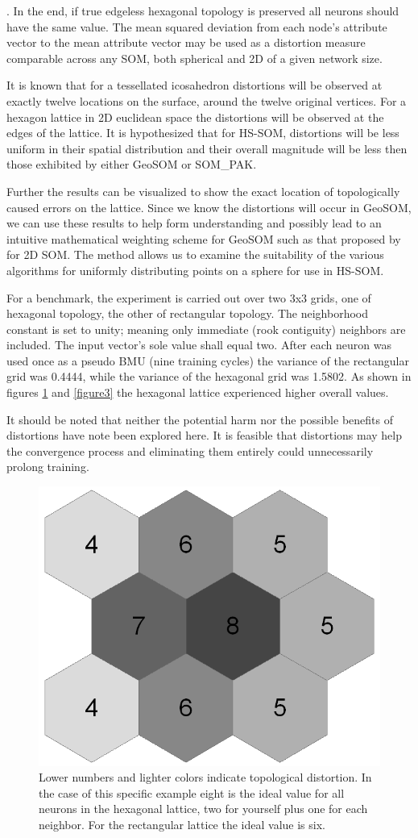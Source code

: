 \documentclass[12pt]{article}
\begin{document}
.  In the end, if true edgeless hexagonal topology is preserved all neurons should have the
same value. The mean squared deviation from each node's attribute vector to
the mean attribute vector may be used as a distortion measure comparable
across any SOM, both spherical and 2D of a given network size.

It is known that for a tessellated icosahedron distortions
will be observed at exactly twelve locations on the surface, around the twelve
original vertices.  For a hexagon lattice in 2D euclidean space the
distortions will be observed at the edges of the lattice.  It is hypothesized
that for HS-SOM, distortions will be less uniform in their spatial
distribution and their overall magnitude will be less then those exhibited by
either GeoSOM or SOM\_PAK.

Further the results can be visualized to show the exact location of
topologically caused errors on the lattice.  Since we know the distortions
will occur in GeoSOM, we can use these results to help form understanding and
possibly lead to an intuitive mathematical weighting scheme for GeoSOM such as
that proposed by \cite{Kohonen2000} for 2D SOM. The method allows us to
examine the suitability of the various algorithms for uniformly distributing
points on a sphere for use in HS-SOM.

For a benchmark, the experiment is carried out over two 3x3 grids, one of
hexagonal topology, the other of rectangular topology. The neighborhood
constant is set to unity; meaning only immediate (rook contiguity) neighbors
are included. The input vector's sole value shall equal two. After each
neuron was used once as a pseudo BMU (nine training cycles) the variance of
the rectangular grid was 0.4444, while the variance of the hexagonal grid was
1.5802. As shown in figures \ref{figure2} and \ref{figure3} the hexagonal lattice
experienced higher overall values.

It should be noted that neither the potential harm nor the possible benefits
of distortions have note been explored here.  It is feasible that distortions
may help the convergence process and eliminating them entirely could
unnecessarily prolong training.

\begin{figure}
\centering
\includegraphics[width=0.4\linewidth]{figure_hex.png}
\caption{Lower numbers and lighter colors indicate topological distortion.
In the case of this specific example eight is the ideal value for all neurons
in the hexagonal lattice, two for yourself plus one for each neighbor.  For
the rectangular lattice the ideal value is six.}
\label{figure2}
\end{figure}
\end{document}
